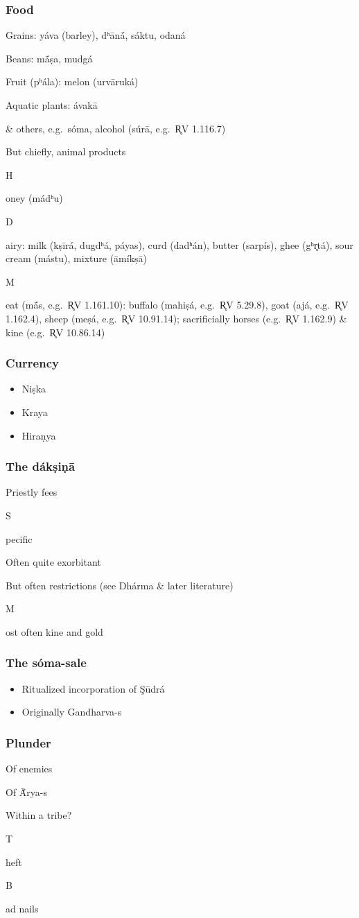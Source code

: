 \documentclass[pdf]{beamer}
\newcommand{\Subitem}[1]{{\setlength\itemindent{12pt} \item[-] #1}}
\newcommand{\Subsubitem}[1]{{\setlength\itemindent{24pt} \item[○] #1}}
\begin{document}
\begin{frame} \frametitle{Food}
\begin{itemize}
	\item Grains: yáva (barley), dʰānā́, sáktu, odaná
	\item Beans: mā́ṣa, mudgá
	\item Fruit (pʰála): melon (urvāruká)
	\item Aquatic plants: ávakā
	\item \& others, e.g.~sóma, alcohol (súrā, e.g.~R̥V 1.116.7)
	\item But chiefly, animal products
	\Subitem Honey (mádʰu)
	\Subitem Dairy: milk (kṣīrá, dugdʰá, páyas), curd (dadʰán), butter (sarpís), ghee (gʰr̥tá), sour cream (mástu), mixture (āmíkṣā)
	\Subitem Meat (mā́s, e.g.~R̥V 1.161.10): buffalo (mahiṣá, e.g.~R̥V 5.29.8), goat (ajá, e.g.~R̥V 1.162.4), sheep (meṣá, e.g.~R̥V 10.91.14); sacrificially horses (e.g.~R̥V 1.162.9) \& kine (e.g.~R̥V 10.86.14)
\end{itemize}
\end{frame}

\begin{frame} \frametitle{Currency}
\begin{itemize}
	\item Niṣka
	\item Kraya
	\item Hiraṇya
\end{itemize}
\end{frame}

\begin{frame} \frametitle{The dákṣiṇā}
\begin{itemize}
	\item Priestly fees
	\Subitem Specific
	\item Often quite exorbitant
	\item But often restrictions (see Dhárma \& later literature)
	\Subitem Most often kine and gold
\end{itemize}
\end{frame}

\begin{frame} \frametitle{The sóma-sale}
\begin{itemize}
	\item Ritualized incorporation of Şūdrá
	\item Originally Gandharva-s
\end{itemize}
\end{frame}

\begin{frame} \frametitle{Plunder}
\begin{itemize}
	\item Of enemies
	\item Of Ā́rya-s
	\item Within a tribe?
	\Subitem Theft
	\Subsubitem Bad nails
\end{itemize}
\end{frame}
\end{document}
